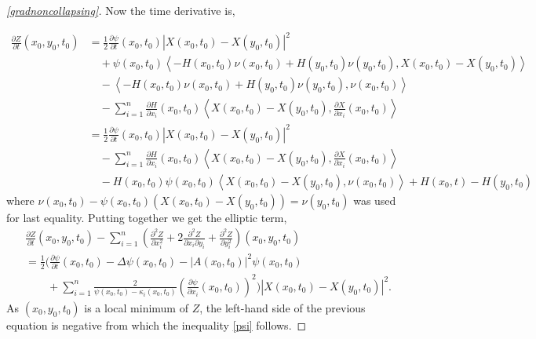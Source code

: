 \begin{proof}[\cref{gradnoncollapsing}]
    Now the time derivative is,
    
    \begin{align*}
        \frac{\partial Z}{\partial t}(x_{0},y_{0},t_{0}) & = \frac{1}{2} \frac{\partial \psi}{\partial t}(x_{0},t_{0})|X(x_{0},t_{0})-X(y_{0},t_{0})|^{2} \\
        & \quad + \psi(x_{0},t_{0}) \left< -H(x_{0},t_{0})\nu(x_{0},t_{0})+H(y_{0},t_{0})\nu(y_{0},t_{0}), X(x_{0},t_{0})-X(y_{0},t_{0}) \right>  \\
        &\quad - \left< -H(x_{0},t_{0})\nu(x_{0},t_{0})+H(y_{0},t_{0})\nu(y_{0},t_{0}), \nu (x_{0},t_{0}) \right> \\
        & \quad - \sum_{i=1}^{n} \frac{\partial H}{\partial x_{i}}(x_{0},t_{0}) \left< X(x_{0},t_{0})-X(y_{0},t_{0}), \frac{\partial X}{\partial x_{i}}(x_{0},t_{0}) \right> \\
        & = \frac{1}{2} \frac{\partial \psi}{\partial t}(x_{0},t_{0})|X(x_{0},t_{0})-X(y_{0},t_{0})|^{2} \\
        & \quad - \sum_{i=1}^{n} \frac{\partial H}{\partial x_{i}}(x_{0},t_{0})\left< X(x_{0},t_{0})-X(y_{0},t_{0}), \frac{\partial X}{\partial x_{i}}(x_{0},t_{0}) \right> \\ 
        & \quad -H(x_{0},t_{0})\psi(x_{0},t_{0})\left< X(x_{0},t_{0})-X(y_{0},t_{0}), \nu(x_{0},t_{0}) \right> + H(x_{0},t)-H(y_{0},t_{0})
    \end{align*}
    where $ \nu(x_{0},t_{0}) - \psi(x_{0},t_{0})(X(x_{0},t_{0})-X(y_{0},t_{0})) =\nu(y_{0},t_{0})  $ was used for last equality. Putting together we get the elliptic term, \begin{align*}
        & \frac{\partial Z}{\partial t}(x_{0},y_{0},t_{0}) - \sum_{i=1}^{n}\left( \frac{\partial^{2} Z}{\partial x_{i}^{2}} + 2 \frac{\partial^{2}Z}{\partial x_{i}\partial y_{i}} + \frac{\partial^{2} Z}{\partial y_{i}^{2}} \right)(x_{0},y_{0},t_{0}) \\
        & = \frac{1}{2}\bigg( \frac{\partial \psi}{\partial t}(x_{0},t_{0}) - \Delta \psi(x_{0},t_{0}) - |A(x_{0},t_{0})|^{2} \psi(x_{0},t_{0}) \\
        & \qquad + \sum_{i=1}^{n} \frac{2}{\psi(x_{0},t_{0})-\kappa_{i}(x_{0},t_{0})}\left( \frac{\partial \psi}{\partial x_{i}}(x_{0},t_{0}) \right)^{2} \bigg)|X(x_{0},t_{0})-X(y_{0},t_{0})|^{2}.
    \end{align*}
    As $ (x_{0},y_{0},t_{0}) $ is a local minimum of $ Z $, the left-hand side of the previous equation is negative from which the inequality \cref{psi} follows. 
\end{proof} 
    
